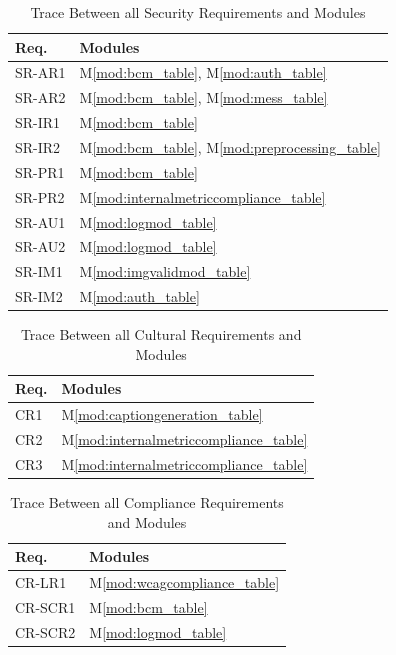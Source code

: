 \documentclass[12pt, titlepage]{article}
\newcommand{\mref}[1]{M\ref{#1}}
\begin{document}
\begin{table}[H]
  \caption{Trace Between all Security Requirements and Modules}
  \label{TblSRT1}
  \centering
  \small
  \begin{tabularx}{\textwidth}{>{\RaggedRight\arraybackslash}p{}Y}
    \toprule
    \textbf{Req.} & \textbf{Modules}\\
    \midrule
    SR-AR1 & \mref{mod:bcm_table}, \mref{mod:auth_table}\\
    SR-AR2 & \mref{mod:bcm_table}, \mref{mod:mess_table}\\
    SR-IR1 & \mref{mod:bcm_table}\\
    SR-IR2 & \mref{mod:bcm_table}, \mref{mod:preprocessing_table}\\
    SR-PR1 & \mref{mod:bcm_table}\\
    SR-PR2 & \mref{mod:internalmetriccompliance_table}\\
    SR-AU1 & \mref{mod:logmod_table}\\
    SR-AU2 & \mref{mod:logmod_table}\\
    SR-IM1 & \mref{mod:imgvalidmod_table}\\
    SR-IM2 & \mref{mod:auth_table}\\
    \bottomrule
  \end{tabularx}
\end{table}

\begin{table}[H]
  \caption{Trace Between all Cultural Requirements and Modules}
  \label{TblCR}
  \centering
  \small
  \begin{tabularx}{\textwidth}{>{\RaggedRight\arraybackslash}p{}Y}
    \toprule
    \textbf{Req.} & \textbf{Modules}\\
    \midrule
    CR1 & \mref{mod:captiongeneration_table}\\
    CR2 & \mref{mod:internalmetriccompliance_table}\\
    CR3 & \mref{mod:internalmetriccompliance_table}\\
    \bottomrule
  \end{tabularx}
\end{table}

\begin{table}[H]
  \caption{Trace Between all Compliance Requirements and Modules}
  \label{TbltCompR}
  \centering
  \small
  \begin{tabularx}{\textwidth}{>{\RaggedRight\arraybackslash}p{}Y}
    \toprule
    \textbf{Req.} & \textbf{Modules}\\
    \midrule
    CR-LR1 & \mref{mod:wcagcompliance_table}\\
    CR-SCR1 & \mref{mod:bcm_table}\\
    CR-SCR2 & \mref{mod:logmod_table}\\
    \bottomrule
  \end{tabularx}
\end{table}
\end{document}
